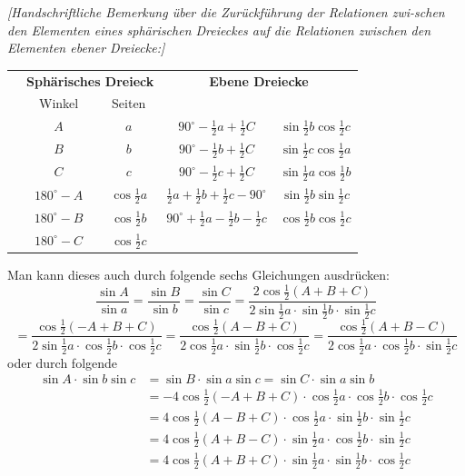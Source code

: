 \documentclass[12pt,a4paper]{article}
\begin{document}
\newpage
\textit{[Handschriftliche Bemerkung \"uber die Zur\"uckf\"uhrung der Relationen zwi-\/schen den Elementen eines sph\"arischen Dreieckes auf die Relationen zwischen
den Elementen ebener Dreiecke:]}

\begin{center}
\begin{tabular}{|l|cc|cc|}
\hline
 & \multicolumn{2}{c|}{\textbf{Sph\"arisches Dreieck}} & \multicolumn{2}{c|}{\textbf{Ebene Dreiecke}} \\
 & Winkel & Seiten & & \\
\hline
 & $A$ & $a$ & $90^\circ - \tfrac{1}{2}a + \tfrac{1}{2}C$ & $\sin\tfrac{1}{2}b \cos\tfrac{1}{2}c$ \\
 & $B$ & $b$ & $90^\circ - \tfrac{1}{2}b + \tfrac{1}{2}C$ & $\sin\tfrac{1}{2}c \cos\tfrac{1}{2}a$ \\
 & $C$ & $c$ & $90^\circ - \tfrac{1}{2}c + \tfrac{1}{2}C$ & $\sin\tfrac{1}{2}a \cos\tfrac{1}{2}b$ \\
 & $180^\circ - A$ & $\cos\tfrac{1}{2}a$ & $\tfrac{1}{2}a + \tfrac{1}{2}b + \tfrac{1}{2}c - 90^\circ$ & $\sin\tfrac{1}{2}b \sin\tfrac{1}{2}c$ \\
 & $180^\circ - B$ & $\cos\tfrac{1}{2}b$ & $90^\circ + \tfrac{1}{2}a - \tfrac{1}{2}b - \tfrac{1}{2}c$ & $\cos\tfrac{1}{2}b \cos\tfrac{1}{2}c$ \\
 & $180^\circ - C$ & $\cos\tfrac{1}{2}c$ & & \\
\hline
\end{tabular}
\end{center}

\newpage
Man kann dieses auch durch folgende sechs Gleichungen ausdr\"ucken:
\[
\frac{\sin A}{\sin a} = \frac{\sin B}{\sin b} = \frac{\sin C}{\sin c} = \frac{2\cos\tfrac{1}{2}(A+B+C)}{2\sin\tfrac{1}{2}a \cdot \sin\tfrac{1}{2}b \cdot \sin\tfrac{1}{2}c}
\]
\[
= \frac{\cos\tfrac{1}{2}(-A+B+C)}{2\sin\tfrac{1}{2}a \cdot \cos\tfrac{1}{2}b \cdot \cos\tfrac{1}{2}c}
= \frac{\cos\tfrac{1}{2}(A-B+C)}{2\cos\tfrac{1}{2}a \cdot \sin\tfrac{1}{2}b \cdot \cos\tfrac{1}{2}c}
= \frac{\cos\tfrac{1}{2}(A+B-C)}{2\cos\tfrac{1}{2}a \cdot \cos\tfrac{1}{2}b \cdot \sin\tfrac{1}{2}c}
\]
oder durch folgende
\begin{align*}
\sin A \cdot \sin b \sin c &= \sin B \cdot \sin a \sin c = \sin C \cdot \sin a \sin b \\
&= -4\cos\tfrac{1}{2}(-A+B+C) \cdot \cos\tfrac{1}{2}a \cdot \cos\tfrac{1}{2}b \cdot \cos\tfrac{1}{2}c \\
&= 4\cos\tfrac{1}{2}(A-B+C) \cdot \cos\tfrac{1}{2}a \cdot \sin\tfrac{1}{2}b \cdot \sin\tfrac{1}{2}c \\
&= 4\cos\tfrac{1}{2}(A+B-C) \cdot \sin\tfrac{1}{2}a \cdot \cos\tfrac{1}{2}b \cdot \sin\tfrac{1}{2}c \\
&= 4\cos\tfrac{1}{2}(A+B+C) \cdot \sin\tfrac{1}{2}a \cdot \sin\tfrac{1}{2}b \cdot \cos\tfrac{1}{2}c
\end{align*}
\end{document}
